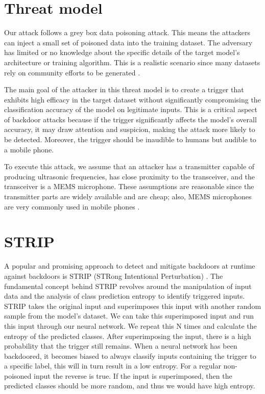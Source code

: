 \documentclass{report}
\theoremstyle{definition}
\theoremstyle{remark}
\begin{document}
\section{Threat model}
Our attack follows a grey box data poisoning attack. This means the attackers can inject a small set of poisoned data into the training dataset. The adversary has limited or no knowledge about the specific details of the target model's architecture or training algorithm. This is a realistic scenario since many datasets rely on community efforts to be generated \cite{Speech_commands} \cite{CommonVoice}.

The main goal of the attacker in this threat model is to create a trigger that exhibits high efficacy in the target dataset without significantly compromising the classification accuracy of the model on legitimate inputs. This is a critical aspect of backdoor attacks because if the trigger significantly affects the model's overall accuracy, it may draw attention and suspicion, making the attack more likely to be detected. Moreover, the trigger should be inaudible to humans but audible to a mobile phone.

To execute this attack, we assume that an attacker has a transmitter capable of producing ultrasonic frequencies, has close proximity to the transceiver, and the transceiver is a MEMS microphone. These assumptions are reasonable since the transmitter parts are widely available and are cheap; also, MEMS microphones are very commonly used in mobile phones \cite{7180939}. 

\section{STRIP}
A popular and promising approach to detect and mitigate backdoors at runtime against backdoors is STRIP (STRong Intentional Perturbation) \cite{Strip}. The fundamental concept behind STRIP revolves around the manipulation of input data and the analysis of class prediction entropy to identify triggered inputs. STRIP takes the original input and superimposes this input with another random sample from the model's dataset. We can take this superimposed input and run this input through our neural network. We repeat this N times and calculate the entropy of the predicted classes. After superimposing the input, there is a high probability that the trigger still remains. When a neural network has been backdoored, it becomes biased to always classify inputs containing the trigger to a specific label, this will in turn result in a low entropy. For a regular non-poisoned input the reverse is true. If the input is superimposed, then the predicted classes should be more random, and thus we would have high entropy. 
\end{document}
